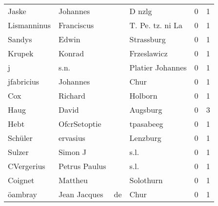 \begin{tabular}{llllrr}
                    Jaske &                           Johannes &             &                                      D nzlg &          0 &         1 \\
              Lismanninus &                         Franciscus &             &                            T. Pe. tz. ni La &          0 &         1 \\
                   Sandys &                              Edwin &             &                                  Strassburg &          0 &         1 \\
                   Krupek &                             Konrad &             &                                 Frzeslawicz &          0 &         1 \\
                        j &                               s.n. &             &                            Platier Johannes &          0 &         1 \\
               jfabricius &                           Johannes &             &                                        Chur &          0 &         1 \\
                      Cox &                            Richard &             &                                     Holborn &          0 &         1 \\
                     Haug &                              David &             &                                    Augsburg &          0 &         3 \\
                     Hebt &                       OfcrSetoptie &             &                                   tpasabeeg &          0 &         1 \\
                  Schüler &                           ervasius &             &                                    Lenzburg &          0 &         1 \\
                   Sulzer &                            Simon J &             &                                        s.l. &          0 &         1 \\
               CVergerius &                      Petrus Paulus &             &                                        s.l. &          0 &         1 \\
                  Coignet &                            Mattheu &             &                                   Solothurn &          0 &         1 \\
                  öambray &                       Jean Jacques &          de &                                        Chur &          0 &         1 \\

\end{tabular}
